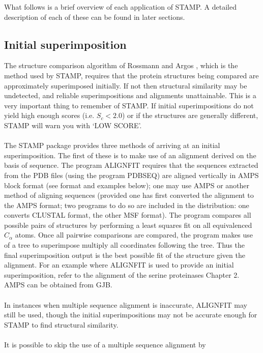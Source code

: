 What follows is a brief overview of each application of STAMP.  A
detailed description of each of these can be found in later
sections.

\subsection{Initial superimposition}

The structure comparison algorithm of Rossmann and Argos 
\cite{rossmann74}, which is the method used by STAMP, requires that the 
protein structures being compared are approximately superimposed 
initially.  If not then structural similarity may be undetected, and 
reliable superimpositions and alignments unattainable.  This is a very important
thing to remember of STAMP.  If initial superimpositions do not yield high
enough scores (i.e. $S_{c} < 2.0$) or if the structures are generally different, 
STAMP will warn you with `LOW SCORE'.\\
\\
The STAMP package provides three methods of arriving at an initial 
superimposition.  The first of these is to make use of an alignment
derived on the basis of sequence.  The program ALIGNFIT requires
that the sequences extracted from the PDB files (using the program
PDBSEQ) are aligned vertically in AMPS block format (see format and
examples below); one may use AMPS or another method of aligning sequences 
(provided one has first converted the alignment to the AMPS format; 
two programs to do so are included in the distribution: one converts CLUSTAL
format, the other MSF format).
The program compares all possible pairs of
structures by performing a least squares fit on all equivalenced 
$C_{\alpha}$ atoms.  Once all pairwise comparisons are compared, the
program makes use of a tree to superimpose  multiply all
coordinates following the tree.  Thus the final superimposition
output is the best possible fit of the structure given the
alignment.  For an example where ALIGNFIT is used to provide an
initial superimposition, refer to the alignment of the serine
proteinases Chapter 2.  AMPS can be obtained from GJB.\\
\\
In instances when multiple sequence alignment is inaccurate,
ALIGNFIT may still be used, though the initial superimpositions may
not be accurate enough for STAMP to find structural similarity. \\
\\
It is possible to skip the use of a multiple sequence alignment by 
